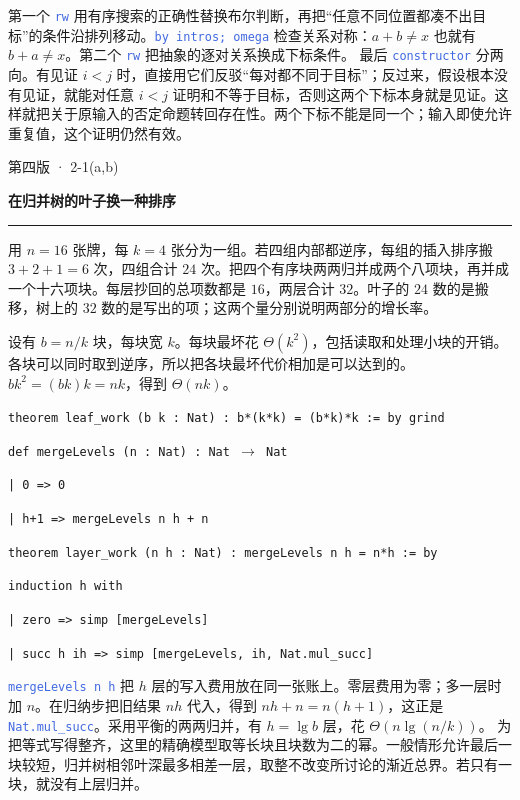 \documentclass[UTF8,11pt,a4paper,fontset=fandol]{ctexart}
\newcommand{\HandoutLesson}[2]{%
  \par{\small\heiti\color{BrickRed}#1}\par\vspace{3pt}
  {\fontsize{21}{27}\selectfont\heiti\bfseries #2}\par
  \textcolor{BrickRed}{\rule{\linewidth}{.7pt}}\par}
\newcommand{\src}[1]{\textcolor{RoyalBlue}{\texttt{#1}}}
\newcommand{\subhead}[1]{\par\vspace{3pt}{\heiti\bfseries\color{RoyalBlue}#1}\par}
\newenvironment{leanblock}{\par\smallskip\noindent\begin{lrbox}{\leanbox}\begin{minipage}{\dimexpr\linewidth-12pt\relax}\raggedright\small\setlength{\parskip}{0pt}}{\end{minipage}\end{lrbox}\colorbox{RoyalBlue!6}{\usebox{\leanbox}}\par\smallskip}
\newcommand{\lineofcode}[2]{\noindent\hspace*{#1em}\strut\texttt{#2}\par}
\begin{document}
第一个 \src{rw} 用有序搜索的正确性替换布尔判断，再把“任意不同位置都凑不出目标”的条件沿排列移动。\src{by intros; omega} 检查关系对称：$a+b\ne x$ 也就有 $b+a\ne x$。第二个 \src{rw} 把抽象的逐对关系换成下标条件。
最后 \src{constructor} 分两向。有见证 $i<j$ 时，直接用它们反驳“每对都不同于目标”；反过来，假设根本没有见证，就能对任意 $i<j$ 证明和不等于目标，否则这两个下标本身就是见证。这样就把关于原输入的否定命题转回存在性。两个下标不能是同一个；输入即使允许重复值，这个证明仍然有效。
\par{}
\clearpage{}\label{p41}\HandoutLesson{第四版 · 2-1(a,b)}{在归并树的叶子换一种排序}
用 $n=16$ 张牌，每 $k=4$ 张分为一组。若四组内部都逆序，每组的插入排序搬 $3+2+1=6$ 次，四组合计 $24$ 次。把四个有序块两两归并成两个八项块，再并成一个十六项块。每层抄回的总项数都是 $16$，两层合计 $32$。叶子的 $24$ 数的是搬移，树上的 $32$ 数的是写出的项；这两个量分别说明两部分的增长率。
\subhead{(a) 叶子层的总花费}
设有 $b=n/k$ 块，每块宽 $k$。每块最坏花 $\Theta(k^2)$，包括读取和处理小块的开销。各块可以同时取到逆序，所以把各块最坏代价相加是可以达到的。$b k^2=(bk)k=nk$，得到 $\Theta(nk)$。
\begin{leanblock}
\lineofcode{0.0}{theorem leaf\_work (b k : Nat) : b*(k*k) = (b*k)*k := by grind}
\end{leanblock}
\subhead{(b) 上层怎样合并}
\begin{leanblock}
\lineofcode{0.0}{def mergeLevels (n : Nat) : Nat \ensuremath{\to} Nat}
\lineofcode{0.9}{| 0 => 0}
\lineofcode{0.9}{| h+1 => mergeLevels n h + n}
\end{leanblock}
\begin{leanblock}
\lineofcode{0.0}{theorem layer\_work (n h : Nat) : mergeLevels n h = n*h := by}
\lineofcode{0.9}{induction h with}
\lineofcode{0.9}{| zero => simp [mergeLevels]}
\lineofcode{0.9}{| succ h ih => simp [mergeLevels, ih, Nat.mul\_succ]}
\end{leanblock}
\src{mergeLevels n h} 把 $h$ 层的写入费用放在同一张账上。零层费用为零；多一层时加 $n$。在归纳步把旧结果 $nh$ 代入，得到 $nh+n=n(h+1)$，这正是 \src{Nat.mul\_succ}。采用平衡的两两归并，有 $h=\lg b$ 层，花 $\Theta(n\lg(n/k))$。
为把等式写得整齐，这里的精确模型取等长块且块数为二的幂。一般情形允许最后一块较短，归并树相邻叶深最多相差一层，取整不改变所讨论的渐近总界。若只有一块，就没有上层归并。
\par{}
\end{document}
